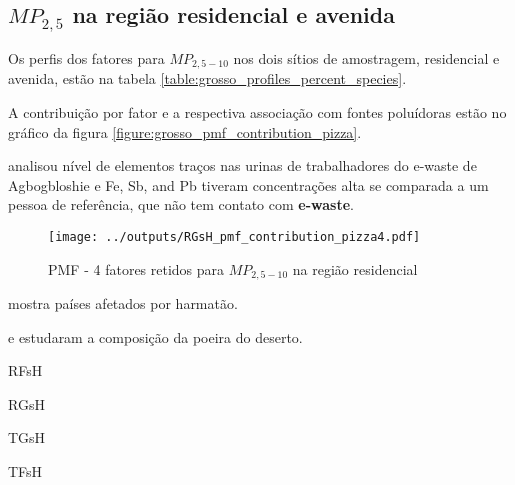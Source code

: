 \subsection{$MP_{2,5}$ na região residencial e avenida}

Os perfis dos fatores para $MP_{2,5-10}$ nos dois sítios de amostragem, 
residencial e avenida, estão na tabela \ref{table:grosso_profiles_percent_species}.

A contribuição por fator e a respectiva associação com fontes poluídoras
estão no gráfico da figura \ref{figure:grosso_pmf_contribution_pizza}. 

\citep{asante2012} analisou nível de elementos traços nas urinas de trabalhadores 
do e-waste de Agbogbloshie e Fe, Sb, and Pb tiveram concentrações alta se comparada
a um pessoa de referência, que não tem contato com \textbf{e-waste}.

\begin{figure}[H]
\begin{center}
  \texttt{[image: ../outputs/RGsH\_pmf\_contribution\_pizza4.pdf]}
  \caption{PMF - 4 fatores retidos para $MP_{2,5-10}$ na região residencial}
\end{center}
\end{figure}

\citep{kaku2016}

\citep{prospero2002} mostra países afetados por harmatão. 

\citep{engelbrecht2009a} e \citep{engelbrecht2009b} estudaram a composição 
da poeira do deserto.


\begin{table}[H]
  \centering
  \caption{RFsH}
  
\end{table}

\begin{table}[H]
  \centering
  \caption{RGsH}
  
\end{table}

\begin{table}[H]
  \centering
  \caption{TGsH}
  
\end{table}


\begin{table}[H]
  \centering
  \caption{TFsH}
  
\end{table}



